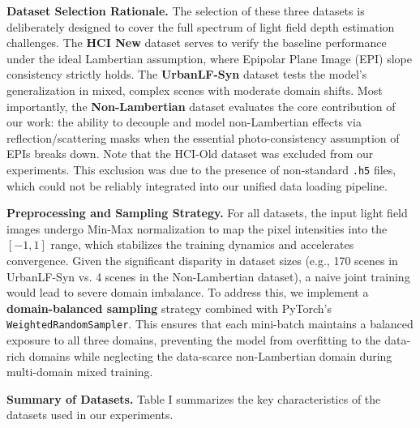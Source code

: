\documentclass[lettersize,journal]{IEEEtran}
\begin{document}
\textbf{Dataset Selection Rationale.} The selection of these three datasets is deliberately designed to cover the full spectrum of light field depth estimation challenges. The \textbf{HCI New} dataset serves to verify the baseline performance under the ideal Lambertian assumption, where Epipolar Plane Image (EPI) slope consistency strictly holds. The \textbf{UrbanLF-Syn} dataset tests the model's generalization in mixed, complex scenes with moderate domain shifts. Most importantly, the \textbf{Non-Lambertian} dataset evaluates the core contribution of our work: the ability to decouple and model non-Lambertian effects via reflection/scattering masks when the essential photo-consistency assumption of EPIs breaks down. Note that the HCI-Old dataset was excluded from our experiments. This exclusion was due to the presence of non-standard \texttt{.h5} files, which could not be reliably integrated into our unified data loading pipeline.

\textbf{Preprocessing and Sampling Strategy.} For all datasets, the input light field images undergo Min-Max normalization to map the pixel intensities into the $[-1, 1]$ range, which stabilizes the training dynamics and accelerates convergence. Given the significant disparity in dataset sizes (e.g., 170 scenes in UrbanLF-Syn vs. 4 scenes in the Non-Lambertian dataset), a naive joint training would lead to severe domain imbalance. To address this, we implement a \textbf{domain-balanced sampling} strategy combined with PyTorch's \texttt{WeightedRandomSampler}. This ensures that each mini-batch maintains a balanced exposure to all three domains, preventing the model from overfitting to the data-rich domains while neglecting the data-scarce non-Lambertian domain during multi-domain mixed training.

\textbf{Summary of Datasets.} Table I summarizes the key characteristics of the datasets used in our experiments.

\begin{table}[!t]
\caption{Summary of the Datasets Used for Training and Evaluation}\label{tab:datasets}
\centering\small
{}
\end{table}
\end{document}
